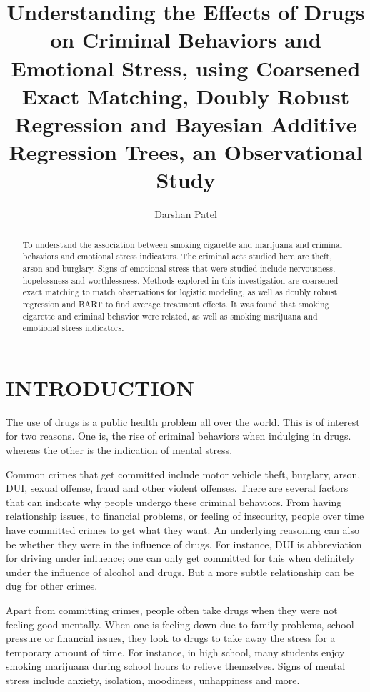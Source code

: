 \documentclass[a4paper, 10pt, conference]{ieeeconf}
\title{\Large \bf Understanding the Effects of Drugs on Criminal Behaviors and Emotional Stress, using Coarsened Exact Matching, Doubly Robust Regression and Bayesian Additive Regression Trees, an Observational Study}
\author{Darshan Patel}
\begin{document}
\maketitle
\thispagestyle{fancy}
\begin{abstract}

To understand the association between smoking cigarette and marijuana and criminal behaviors and emotional stress indicators. The criminal acts studied here are theft, arson and burglary. Signs of emotional stress that were studied include nervousness, hopelessness and worthlessness. Methods explored in this investigation are coarsened exact matching to match observations for logistic modeling, as well as doubly robust regression and BART to find average treatment effects. It was found that smoking cigarette and criminal behavior were related, as well as smoking marijuana and emotional stress indicators. 
\end{abstract}

\section{INTRODUCTION}

The use of drugs is a public health problem all over the world. This is of interest for two reasons. One is, the rise of criminal behaviors when indulging in drugs. whereas the other is the indication of mental stress. 

Common crimes that get committed include motor vehicle theft, burglary, arson, DUI, sexual offense, fraud and other violent offenses. There are several factors that can indicate why people undergo these criminal behaviors. From having relationship issues, to financial problems, or feeling of insecurity, people over time have committed crimes to get what they want. An underlying reasoning can also be whether they were in the influence of drugs. For instance, DUI is abbreviation for driving under influence; one can only get committed for this when definitely under the influence of alcohol and drugs. But a more subtle relationship can be dug for other crimes. 

Apart from committing crimes, people often take drugs when they were not feeling good mentally. When one is feeling down due to family problems, school pressure or financial issues, they look to drugs to take away the stress for a temporary amount of time. For instance, in high school, many students enjoy smoking marijuana during school hours to relieve themselves. Signs of mental stress include anxiety, isolation, moodiness, unhappiness and more. 
\end{document}
